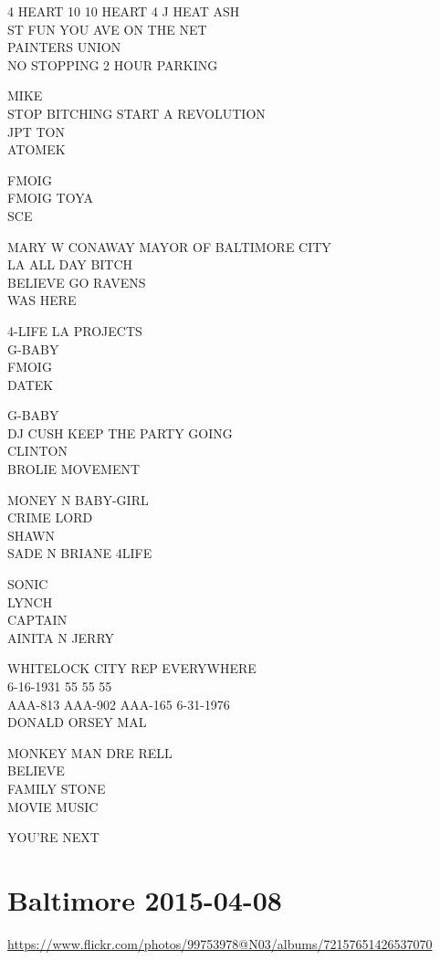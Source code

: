 \documentclass[10pt,letterpaper]{article}
\begin{document}
4 HEART 10 10 HEART 4 J HEAT ASH\\
ST FUN YOU AVE ON THE NET\\
PAINTERS UNION\\
NO STOPPING 2 HOUR PARKING

MIKE\\
STOP BITCHING START A REVOLUTION\\
JPT TON\\
ATOMEK

FMOIG\\
FMOIG TOYA\\
SCE

MARY W CONAWAY MAYOR OF BALTIMORE CITY\\
LA ALL DAY BITCH\\
BELIEVE GO RAVENS\\
WAS HERE

4{-}LIFE LA PROJECTS\\
G{-}BABY\\
FMOIG\\
DATEK

G{-}BABY\\
DJ CUSH KEEP THE PARTY GOING\\
CLINTON\\
BROLIE MOVEMENT

MONEY N BABY{-}GIRL\\
CRIME LORD\\
SHAWN\\
SADE N BRIANE 4LIFE

SONIC\\
LYNCH\\
CAPTAIN\\
AINITA N JERRY

WHITELOCK CITY REP EVERYWHERE\\
6{-}16{-}1931 55 55 55\\
AAA{-}813 AAA{-}902 AAA{-}165 6{-}31{-}1976\\
DONALD ORSEY MAL

MONKEY MAN DRE RELL\\
BELIEVE\\
FAMILY STONE\\
MOVIE MUSIC

YOU'RE NEXT
\

\section*{Baltimore 2015-04-08}

\url{https://www.flickr.com/photos/99753978@N03/albums/72157651426537070}
\end{document}
